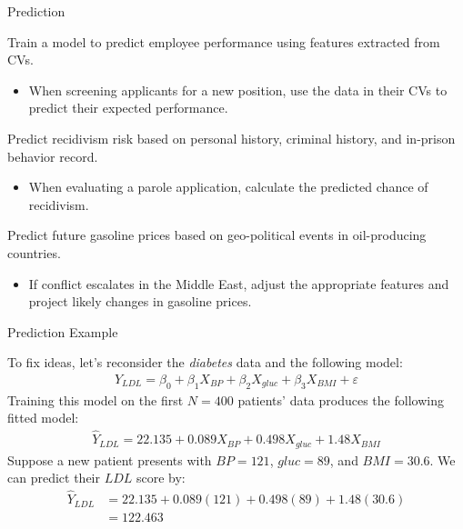 \documentclass{beamer}\usepackage[]{graphicx}\usepackage[]{color}
\begin{document}
\begin{frame}{Prediction}
  
  Train a model to predict employee performance using features extracted from 
  CVs.
  \begin{itemize}
  \item When screening applicants for a new position, use the data in their CVs 
    to predict their expected performance.  
  \end{itemize}
  \vb
  Predict recidivism risk based on personal history, criminal history, and 
  in-prison behavior record.
  \begin{itemize}
  \item When evaluating a parole application, calculate the predicted chance of 
    recidivism.
  \end{itemize}
  \vb
  Predict future gasoline prices based on geo-political events in
  oil-producing countries.  
  \begin{itemize}
    \item If conflict escalates in the Middle East, adjust the appropriate
      features and project likely changes in gasoline prices.
  \end{itemize}
  
\end{frame}


\begin{frame}{Prediction Example}
  


To fix ideas, let's reconsider the \emph{diabetes} data and the following model:
\begin{align*}
  Y_{LDL} = \beta_0 + \beta_1 X_{BP} + \beta_2 X_{gluc} + \beta_3 X_{BMI} + 
  \varepsilon
\end{align*}
Training this model on the first $N = 400$ patients' data produces the following
fitted model:
\begin{align*}
  \hat{Y}_{LDL} = 22.135 + 0.089 X_{BP} + 0.498 X_{gluc} + 
  1.48 X_{BMI}
\end{align*}
\pause
Suppose a new patient presents with $BP = 121$, $gluc = 89$, and
$BMI = 30.6$. We can predict their $LDL$ score by:
\begin{align*}
  \hat{Y}_{LDL} &= 22.135 + 0.089 (121) + 0.498 
  (89) + 1.48 (30.6)\\
  &= 122.463
\end{align*}

\end{frame}
\end{document}
